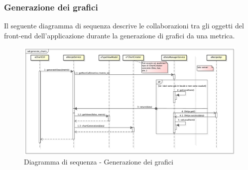 	\subsubsection{Generazione dei grafici} %
	\label{sub:generazione_dei_grafici}
	Il seguente diagramma di sequenza descrive le collaborazioni tra gli oggetti del front-end dell'applicazione durante la generazione di grafici da una metrica. \newline

\begin{figure}[htbp]
	\centering
	\centerline{\includegraphics[scale=0.4]{./images/sequence_diagram/client_chart_generation.pdf}}
	\caption{Diagramma di sequenza - Generazione dei grafici}
\end{figure}



